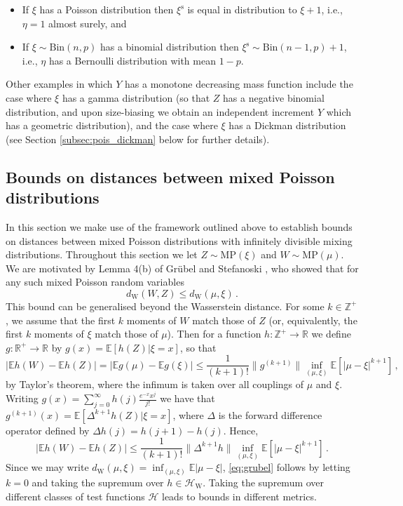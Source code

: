 \documentclass[12pt]{article}
\begin{document}
\begin{itemize}
\item If $\xi$ has a Poisson distribution then $\xi^\text{s}$ is equal in distribution to $\xi+1$, i.e., $\eta=1$ almost surely, and
\item If $\xi\sim\text{Bin}(n,p)$ has a binomial distribution then $\xi^\text{s}\sim\text{Bin}(n-1,p)+1$, i.e., $\eta$ has a Bernoulli distribution with mean $1-p$.
\end{itemize}
Other examples in which $Y$ has a monotone decreasing mass function include the case where $\xi$ has a gamma distribution (so that $Z$ has a negative binomial distribution, and upon size-biasing we obtain an independent increment $Y$ which has a geometric distribution), and the case where $\xi$ has a Dickman distribution (see Section \ref{subsec:pois_dickman} below for further details).

\subsection{Bounds on distances between mixed Poisson distributions}\label{subsec:pois_main}

In this section we make use of the framework outlined above to establish bounds on distances between mixed Poisson distributions with infinitely divisible mixing distributions. Throughout this section we let $Z\sim\text{MP}(\xi)$ and $W\sim\text{MP}(\mu)$. We are motivated by Lemma 4(b) of Gr\"ubel and Stefanoski \cite{grubel05}, who showed that for any such mixed Poisson random variables
\begin{equation}\label{eq:grubel}
d_\text{W}(W,Z) \leq d_\text{W}(\mu,\xi)\,.
\end{equation}
This bound can be generalised beyond the Wasserstein distance. For some $k\in\mathbb{Z}^+$, we assume that the first $k$ moments of $W$ match those of $Z$ (or, equivalently, the first $k$ moments of $\xi$ match those of $\mu$). Then for a function $h:\mathbb{Z}^+\to\mathbb{R}$ we define $g:\mathbb{R}^+\to\mathbb{R}$ by $g(x)=\mathbb{E}[h(Z)|\xi=x]$, so that
\[
|\mathbb{E}h(W)-\mathbb{E}h(Z)|=|\mathbb{E}g(\mu)-\mathbb{E}g(\xi)|\leq\frac{1}{(k+1)!}\lVert g^{(k+1)}\rVert\inf_{(\mu,\xi)}\mathbb{E}\left[|\mu-\xi|^{k+1}\right]\,,
\]
by Taylor's theorem, where the infimum is taken over all couplings of $\mu$ and $\xi$. Writing $g(x)=\sum_{j=0}^\infty h(j)\frac{e^{-x}x^j}{j!}$ we have that $g^{(k+1)}(x)=\mathbb{E}[\Delta^{k+1}h(Z)|\xi=x]$, where $\Delta$ is the forward difference operator defined by $\Delta h(j)=h(j+1)-h(j)$. Hence,
\[
|\mathbb{E}h(W)-\mathbb{E}h(Z)|\leq\frac{1}{(k+1)!}\lVert\Delta^{k+1}h\rVert\inf_{(\mu,\xi)}\mathbb{E}\left[|\mu-\xi|^{k+1}\right]\,.
\]
Since we may write $d_\text{W}(\mu,\xi)=\inf_{(\mu,\xi)}\mathbb{E}|\mu-\xi|$, \eqref{eq:grubel} follows by letting $k=0$ and taking the supremum over $h\in\mathcal{H}_\text{W}$. Taking the supremum over different classes of test functions $\mathcal{H}$ leads to bounds in different metrics.
\end{document}
